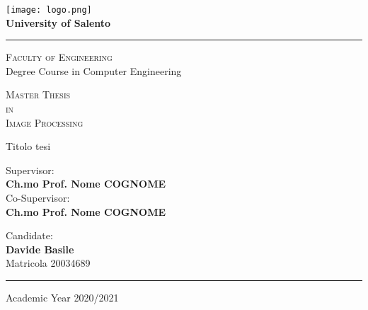 

\linespread{1.5}

\begin{titlepage}
 
\begin{center}
 
\texttt{[image: logo.png]}
\\
\vspace{.3cm}
\textbf{\Large University of Salento}
\vspace{.2cm}
\hrule

\begin{center}
	\doublespacing
	\textsc{\Large Faculty of Engineering} \\

	\textmd{\Large Degree Course in Computer Engineering}
	
	\vspace{1cm} 
	\textsc{\Large Master Thesis} \\
	\textsc{\Large in} \\
	\textsc{\Large Image Processing}	
	\vspace{2.3cm}
	
	\Huge \doublespacing \bfseries \begin{spacing}{1}{Titolo tesi}\end{spacing}
\end{center}
 
\hfill
\vspace{2.5cm}

\begin{flushleft}
	\begin{minipage}[c]{.55\textwidth}
		\singlespacing
		\fontsize{12}{12} \textmd{Supervisor:} \\
		\fontsize{14.4}{12} \textbf{Ch.mo Prof. Nome COGNOME} \\
		\fontsize{12}{12} \textmd{Co-Supervisor:} \\
		\fontsize{14.4}{12} \textbf{Ch.mo Prof. Nome COGNOME}
	\end{minipage}%
	\hspace{10mm}%
	\begin{minipage}[c]{.35\textwidth}
		\bigskip
		\bigskip
		\singlespacing
		\fontsize{12}{12} \textmd{Candidate:} \\
		\fontsize{14.4}{12} \textbf{Davide Basile} \\
		\fontsize{12}{12} \textmd{Matricola 20034689} \\
	\end{minipage}
\end{flushleft}

\vfill
\hfill

\vspace{.25cm}
\hrule
\vspace{.25cm}
{\small Academic Year 2020/2021} 
\end{center}
\clearpage
\end{titlepage}

\restoregeometry
